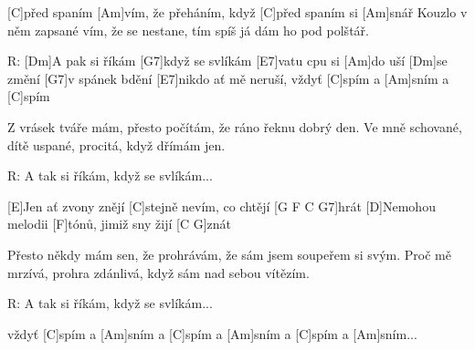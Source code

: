 
[C] před spaním [Am]vím, že přeháním,
když [C] před spaním si [Am]snář
Kouzlo v něm zapsané vím, že se nestane,
tím spíš já dám ho pod polštář.

R: [Dm]A pak si říkám [G7]když se svlíkám [E7]vatu cpu si [Am]do uší
[Dm] se změní [G7]v spánek bdění [E7]nikdo ať mě neruší,
vždyť [C]spím a [Am]sním a [C]spím

Z vrásek tváře mám, přesto počítám,
že ráno řeknu dobrý den.
Ve mně schované, dítě uspané,
procitá, když dřímám jen.

R: A tak si říkám, když se svlíkám...

[E]Jen ať zvony znějí [C]stejně nevím, co chtějí [G F C G7]hrát
[D]Nemohou melodii [F]tónů, jimiž sny žijí [C G]znát


Přesto někdy mám sen, že prohrávám,
že sám jsem soupeřem si svým.
Proč mě mrzívá, prohra zdánlivá,
když sám nad sebou vítězím.

R: A tak si říkám, když se svlíkám...

vždyť [C]spím a [Am]sním a [C]spím a [Am]sním a [C]spím a [Am]sním...



